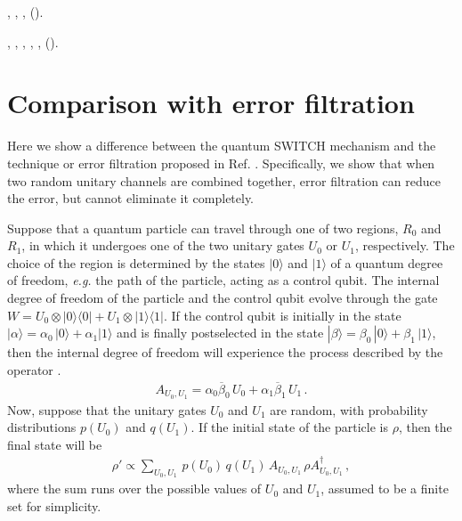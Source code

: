 \documentclass[aps,prl,twocolumn,superscriptaddress,groupedaddress]{revtex4}
\def\>{\rangle}
\def\<{\langle}
\begin{document}
{\begin{thebibliography}{26}
,
  , 
  ,
    ().

,
  ,
  , 
  ,
   \textbf{},
   ().

\end{thebibliography}
}  
\appendix
\section{Comparison with error filtration}\label{appendix}  

Here we show a difference between  the quantum SWITCH mechanism and  the technique or error filtration proposed in Ref. \cite{gisin2005error}.
  Specifically, we show that when two random unitary channels are combined together, error filtration can reduce the error, but cannot eliminate it completely. 
 
Suppose that a quantum particle can travel through one of two regions, $R_0$ and $R_1$, in which it undergoes one of the two unitary gates  $U_0$ or $U_1$, respectively. The choice of the region is determined by the states $|0\>$ and $|1\>$ of a quantum degree of freedom, {\em e.g.} the path of the particle, acting as a control qubit.  The internal degree of freedom of the particle and the control qubit evolve through the gate 
$W  =  U_0  \otimes |0\>\<0|  +  U_1  \otimes |1\>\<1|$. 
If the control qubit is initially in the state $|\alpha\>   = \alpha_0  \,  |0\> +  \alpha_1  |1\>$ and is finally postselected in the state $|\beta\>   = \beta_0  \,  |0\>  +  \beta_1 \,  |1\>$, then the internal degree of freedom will experience the process described by the operator  \cite{Aharonov1990}.   
\begin{align}\label{A}
A_{U_0, U_1}  = \alpha_0 \overline \beta_0  \,  U_0   + \alpha_1 \overline \beta_1 \,  U_1\, .
\end{align}
Now, suppose that the unitary gates $U_0$ and $U_1$ are random, with probability distributions $p(U_0)$ and $q(U_1)$. If the initial state of the particle is $\rho$, then the final state will be 
\begin{align}\label{rhoprime}
\rho' \propto      \sum_{U_0, U_1}   \,   p(U_0)\,  q(U_1) \,    A_{U_0, U_1}\,  \rho  A_{U_0, U_1}^\dag \, ,
\end{align}
where the sum runs over the possible values of $U_0$ and $U_1$, assumed to be a finite set for simplicity.  
\end{document}
